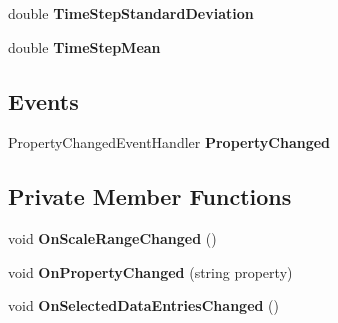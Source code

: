 \begin{DoxyCompactItemize}
\item 
\hypertarget{class_data_dump_processor_1_1_view_model_a641859817b367fae4009b4ba72453043}{double {\bfseries Time\-Step\-Standard\-Deviation}}\label{class_data_dump_processor_1_1_view_model_a641859817b367fae4009b4ba72453043}

\item 
\hypertarget{class_data_dump_processor_1_1_view_model_a31c4b0f802c74160ba8c94d83b564394}{double {\bfseries Time\-Step\-Mean}}\label{class_data_dump_processor_1_1_view_model_a31c4b0f802c74160ba8c94d83b564394}

\end{DoxyCompactItemize}
\subsection*{Events}
\begin{DoxyCompactItemize}
\item 
\hypertarget{class_data_dump_processor_1_1_view_model_a6568aa6b41ced981b29e5c95d41dbf23}{Property\-Changed\-Event\-Handler {\bfseries Property\-Changed}}\label{class_data_dump_processor_1_1_view_model_a6568aa6b41ced981b29e5c95d41dbf23}

\end{DoxyCompactItemize}
\subsection*{Private Member Functions}
\begin{DoxyCompactItemize}
\item 
\hypertarget{class_data_dump_processor_1_1_view_model_af20c61c0daac743d62e32df4789e394d}{void {\bfseries On\-Scale\-Range\-Changed} ()}\label{class_data_dump_processor_1_1_view_model_af20c61c0daac743d62e32df4789e394d}

\item 
\hypertarget{class_data_dump_processor_1_1_view_model_a531ba6ddfda065fbaf5a3ceaee3990b4}{void {\bfseries On\-Property\-Changed} (string property)}\label{class_data_dump_processor_1_1_view_model_a531ba6ddfda065fbaf5a3ceaee3990b4}

\item 
\hypertarget{class_data_dump_processor_1_1_view_model_a684cb0a93f9623fe080255b4f70d10f5}{void {\bfseries On\-Selected\-Data\-Entries\-Changed} ()}\label{class_data_dump_processor_1_1_view_model_a684cb0a93f9623fe080255b4f70d10f5}

\end{DoxyCompactItemize}
